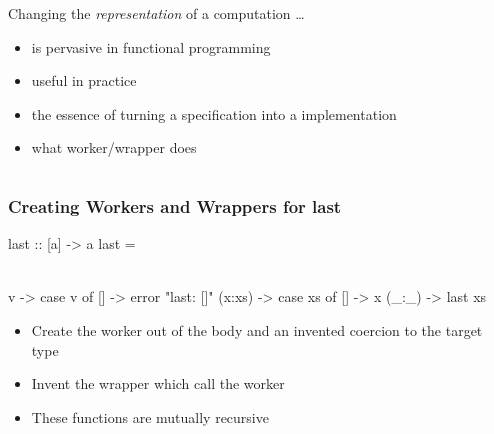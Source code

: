\documentclass[smaller]{beamer}
\begin{document}
\begin{frame}
\begin{columns}[t] 
\begin{column}{0.8\textwidth}
\begin{block}{Changing the {\em representation\/} of a computation \ldots}
\begin{itemize} 
\item is pervasive in functional programming
\item useful in practice
\item the essence of turning a specification into a implementation
\item what worker/wrapper does
\end{itemize} 
\end{block}
\end{column}
\end{columns}
\end{frame}

\begin{frame}[fragile] 
\frametitle{Creating Workers and Wrappers for last}

\begin{semiverbatim}
last :: [a] -> a
\alert<4>{last} = 

\\ v -> case v of
                  []     -> error "last: []"
                  (x:xs) -> case xs of
                             []    -> x
                             (_:_) -> \alert<4>{last} xs



\end{semiverbatim}
\begin{itemize}
\item <2- |alert@2>Create the worker out of the body and an invented coercion to the target type
\item <3- |alert@3>Invent the wrapper which call the worker
\item <4- |alert@4>These functions are mutually recursive
\end{itemize}
\end{frame}
\end{document}
